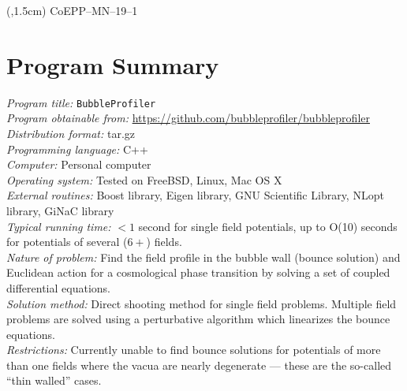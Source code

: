 \documentclass[final,3p,11pt,pdflatex]{elsarticle}
\makeatletter
\newcommand{\bpgitrepo}{%
  \url{https://github.com/bubbleprofiler/bubbleprofiler}\xspace}
\newcommand{\bphomepage}{\bpgitrepo}
\newcommand{\bp}{\texttt{BubbleProfiler}\@\xspace}
\makeatother
\begin{document}
\begin{textblock*}{10em}(\textwidth,1.5cm)
\raggedleft\noindent\footnotesize
CoEPP--MN--19--1
\end{textblock*}

\clearpage
{}
\section*{Program Summary}
\noindent
{\em Program title:} \bp\\[0.5em]
{\em Program obtainable from:} \bphomepage\\[0.5em]
{\em Distribution format:} tar.gz\\[0.5em]
{\em Programming language:} C++\\[0.5em]
{\em Computer:} Personal computer\\[0.5em]
{\em Operating system:} Tested on FreeBSD, Linux, Mac OS X \\[0.5em]
{\em External routines:} Boost library, Eigen library, GNU Scientific Library, NLopt library, GiNaC library \\[0.5em]
{\em Typical running time:} $< 1$ second for single field potentials, up to {\cal O}(10) seconds for potentials of several ($6+$) fields. \\[0.5em]
{\em Nature of problem:}
%
Find the field profile in the bubble wall (bounce solution) and Euclidean action for a cosmological phase transition by solving a set of coupled differential equations. \\[0.5em]
%
{\em Solution method:}
%
Direct shooting method for single field problems. Multiple field problems are solved using a perturbative algorithm which linearizes the bounce equations. \\[0.5em]
%
{\em Restrictions:} Currently unable to find bounce solutions for potentials of more than one fields where the vacua are nearly degenerate --- these are the so-called ``thin walled'' cases.

\clearpage
\tableofcontents

\newpage
\end{document}
